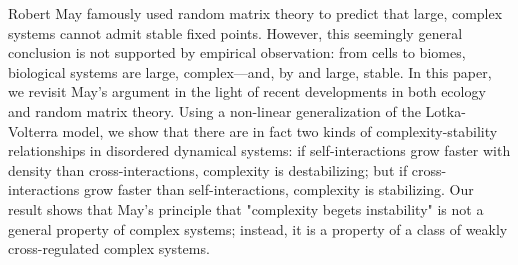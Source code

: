 Robert May famously used random matrix theory to predict that large, complex systems cannot admit stable fixed points. 
However, this seemingly general conclusion is not supported by empirical observation: from cells to biomes, biological systems are large, complex---and, by and large, stable.
In this paper, we revisit May's argument in the light of recent developments in both ecology and random matrix theory. 
Using a non-linear generalization of the Lotka-Volterra model, we show that there are in fact two kinds of complexity-stability relationships in disordered dynamical systems: 
if self-interactions grow faster with density than cross-interactions, complexity is destabilizing; but if cross-interactions grow faster than self-interactions, complexity is stabilizing.
Our result shows that May's principle that "complexity begets instability" is not a general property of complex systems; instead, it is a property of a class of weakly cross-regulated complex systems.